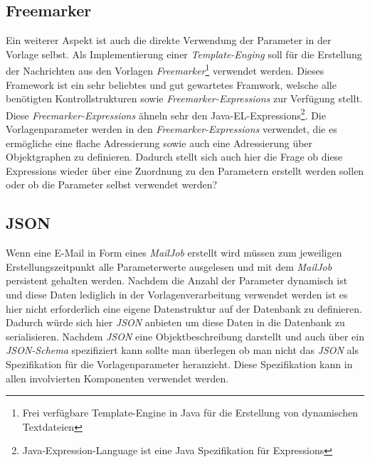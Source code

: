 \subsection{Freemarker}
\label{sec:template-parameter-freemarker}
Ein weiterer Aspekt ist auch die direkte Verwendung der Parameter in der Vorlage selbst. Als Implementierung einer \emph{Template-Enging} soll für die Erstellung der Nachrichten aus den Vorlagen \emph{Freemarker}\footnote{\label{fn:freemarker}Frei verfügbare Template-Engine in Java für die Erstellung von dynamischen Textdateien} verwendet werden. Dieses Framework ist ein sehr beliebtes und gut gewartetes Framwork, welsche alle benötigten Kontrollstrukturen sowie \emph{Freemarker-Expressions} zur Verfügung stellt. Diese \emph{Freemarker-Expressions} ähneln sehr den Java-EL-Expressions\footnote{Java-Expression-Language ist eine Java Spezifikation für Expressions}. 
Die Vorlagenparameter werden in den \emph{Freemarker-Expressions} verwendet, die es ermögliche eine flache Adressierung sowie auch eine Adressierung über Objektgraphen zu definieren. Dadurch stellt sich auch hier die Frage ob diese Expressions wieder über eine Zuordnung zu den Parametern erstellt werden sollen oder ob die Parameter selbst verwendet werden?
\subsection{JSON}
\label{sec:template-parameter-json}
Wenn eine E-Mail in Form eines \emph{MailJob} erstellt wird müssen zum jeweiligen Erstellungszeitpunkt alle Parameterwerte ausgelesen und mit dem \emph{MailJob} persistent gehalten werden. Nachdem die Anzahl der Parameter dynamisch ist und diese Daten lediglich in der Vorlagenverarbeitung verwendet werden ist es hier nicht erforderlich eine eigene Datenstruktur auf der Datenbank zu definieren. Dadurch würde sich hier \emph{JSON} anbieten um diese Daten in die Datenbank zu serialisieren. Nachdem \emph{JSON} eine Objektbeschreibung darstellt und auch über ein \emph{JSON-Schema} spezifiziert kann sollte man überlegen ob man nicht das \emph{JSON} als Spezifikation für die Vorlagenparameter heranzieht. Diese Spezifikation kann in allen involvierten Komponenten verwendet werden. 
\newpage
